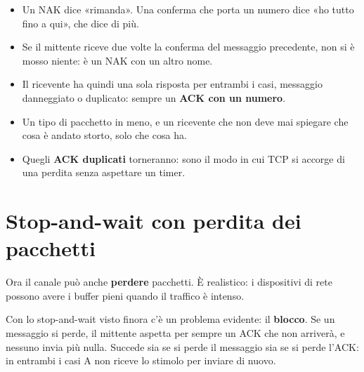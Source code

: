 \begin{itemize}
    \item Un NAK dice «rimanda». Una conferma che porta un numero dice «ho tutto fino a qui», che dice di più.
    \item Se il mittente riceve due volte la conferma del messaggio precedente, non si è mosso niente: è un NAK con un
          altro nome.
    \item Il ricevente ha quindi una sola risposta per entrambi i casi, messaggio danneggiato o duplicato: sempre un
          \textbf{ACK con un numero}.
    \item Un tipo di pacchetto in meno, e un ricevente che non deve mai spiegare che cosa è andato storto, solo che cosa
          ha.
    \item Quegli \textbf{ACK duplicati} torneranno: sono il modo in cui TCP si accorge di una perdita senza aspettare un
          timer.
\end{itemize}

\section{Stop-and-wait con perdita dei pacchetti}

Ora il canale può anche \textbf{perdere} pacchetti. È realistico: i dispositivi di rete possono avere i
buffer pieni quando il traffico è intenso.

Con lo stop-and-wait visto finora c'è un problema evidente: il \textbf{blocco}. Se un messaggio si perde,
il mittente aspetta per sempre un ACK che non arriverà, e nessuno invia più nulla. Succede sia se si perde
il messaggio sia se si perde l'ACK: in entrambi i casi A non riceve lo stimolo per inviare di nuovo.


